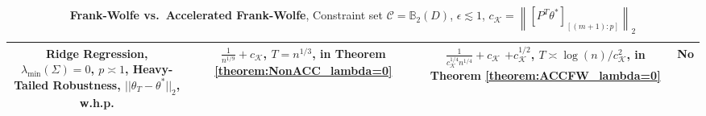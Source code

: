 \documentclass{article}
\begin{document}
\begin{table}[!htbp]
\begin{tabular}{|c|c|c|c|}
        \hline
        \makecell{Ridge Regression, $\lambda_{\min}(\Sigma) = 0$, \\ $p \asymp 1$, Heavy-Tailed Robustness, \\ $||\theta_T - \theta^*||_2$, w.h.p.} & \makecell{\\$\frac{1}{n^{1/9}} + c_{\mathcal{K}}$, \\ \\ $T = n^{1/3}$, \\ in Theorem \ref{theorem:NonACC_lambda=0}} & \makecell{\\$\frac{1}{c_{\mathcal{K}}^{1/4}n^{1/4}} + c_{\mathcal{K}}$ \\ $+ c_{\mathcal{K}}^{1/2}$, \\ \\ $T \asymp \log(n)/c_{\mathcal{K}}^2$, \\ in Theorem \ref{theorem:ACCFW_lambda=0}} & No \\ 
        \hline
    \end{tabular}
    \caption{\textbf{Frank-Wolfe vs.\ Accelerated Frank-Wolfe}, Constraint set $\mathcal{C} = \mathbb{B}_2(D)$, $\epsilon \lesssim 1$, $c_{\mathcal{K}} = \left\|[P^T\theta^*]_{[(m+1):p]}\right\|_2$}
    \label{tab1}
\end{table}
\end{document}

